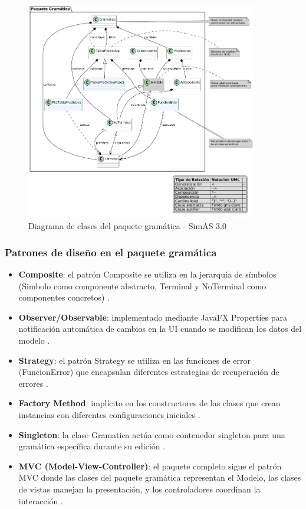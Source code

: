 \begin{figure}[H]
    \centering
    \includegraphics[width=0.9\textwidth]{figuras/Cap9/diagrama_gramatica_bueno.png}
    \caption{Diagrama de clases del paquete gramática - SimAS 3.0}
    \label{fig:diagrama_gramatica}
\end{figure}

\subsubsection{Patrones de diseño en el paquete gramática}

\begin{itemize}
    \item \textbf{Composite}: el patrón Composite se utiliza en la jerarquía de símbolos (Simbolo como componente abstracto, Terminal y NoTerminal como componentes concretos) \cite{gamma1995design}.
    \item \textbf{Observer/Observable}: implementado mediante JavaFX Properties para notificación automática de cambios en la UI cuando se modifican los datos del modelo \cite{gamma1995design}.
    \item \textbf{Strategy}: el patrón Strategy se utiliza en las funciones de error (FuncionError) que encapsulan diferentes estrategias de recuperación de errores \cite{gamma1995design}.
    \item \textbf{Factory Method}: implícito en los constructores de las clases que crean instancias con diferentes configuraciones iniciales \cite{gamma1995design}.
    \item \textbf{Singleton}: la clase Gramatica actúa como contenedor singleton para una gramática específica durante su edición \cite{gamma1995design}.
    \item \textbf{MVC (Model-View-Controller)}: el paquete completo sigue el patrón MVC donde las clases del paquete gramática representan el Modelo, las clases de vistas manejan la presentación, y los controladores coordinan la interacción \cite{burbeck1992applications}.
\end{itemize}

